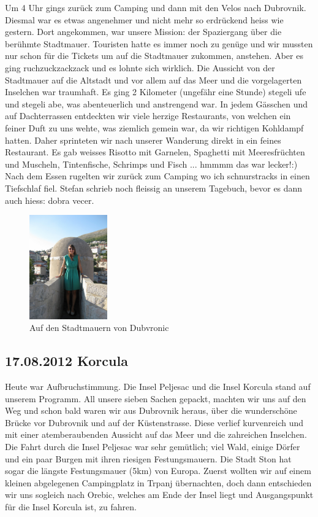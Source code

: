 Um 4 Uhr gings zurück zum Camping und dann mit den Velos nach Dubrovnik.
Diesmal war es etwas angenehmer und nicht mehr so erdrückend heiss wie gestern.
Dort angekommen, war unsere Mission: der Spaziergang über die berühmte Stadtmauer.
Touristen hatte es immer noch zu genüge und wir mussten nur schon für die Tickets um auf die Stadtmauer zukommen, anstehen.
Aber es ging ruchzuckzackzack und es lohnte sich wirklich.
Die Aussicht von der Stadtmauer auf die Altstadt und vor allem auf das Meer und
die vorgelagerten Inselchen war traumhaft.
Es ging 2 Kilometer (ungefähr eine Stunde) stegeli ufe und stegeli abe, was abenteuerlich und anstrengend war.
In jedem Gässchen und auf Dachterrassen entdeckten wir viele herzige Restaurants, von welchen ein feiner Duft zu uns wehte, was ziemlich gemein war, da wir richtigen Kohldampf hatten.
Daher sprinteten wir nach unserer Wanderung direkt in ein feines Restaurant.
Es gab weisses Risotto mit Garnelen, Spaghetti mit Meeresfrüchten und Muscheln,
Tintenfische, Schrimps und Fisch ... hmmmm das war lecker!:) Nach dem Essen rugelten wir zurück zum Camping wo ich schnurstracks in einen Tiefschlaf fiel.
Stefan schrieb noch fleissig an unserem Tagebuch, bevor es dann auch hiess: dobra vecer.

\begin{figure}[H]
    \centering
    \includegraphics[width=0.3\textwidth]{../Bilder/Sommer2012/67.jpg}
    \caption{Auf den Stadtmauern von Dubvronic}
    \label{img:Sommer7}
\end{figure}

\subsection{17.08.2012 Korcula}

Heute war Aufbruchstimmung.
Die Insel Peljesac und die Insel Korcula stand auf unserem Programm.
All unsere sieben Sachen gepackt, machten wir uns auf den Weg und schon bald waren wir aus Dubrovnik heraus, über die wunderschöne Brücke vor Dubrovnik und auf der Küstenstrasse.
Diese verlief kurvenreich und mit einer atemberaubenden Aussicht auf das Meer und die zahreichen Inselchen.
Die Fahrt durch die Insel Peljesac war sehr gemütlich; viel Wald, einige Dörfer und ein paar Burgen mit ihren riesigen Festungsmauern.
Die Stadt Ston hat sogar die längste Festungsmauer (5km) von Europa.
Zuerst wollten wir auf einem kleinen abgelegenen Campingplatz in Trpanj übernachten, doch dann entschieden wir uns sogleich nach Orebic, welches am Ende der Insel liegt und Ausgangspunkt für die Insel Korcula ist, zu fahren.

